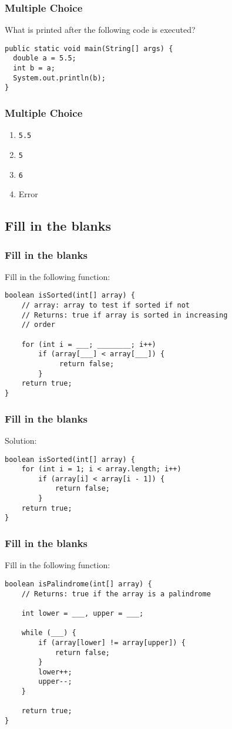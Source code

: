 \documentclass[9pt]{beamer}
\begin{document}
\begin{frame}[fragile]
  \frametitle{Multiple Choice}
  What is printed after the following code is executed?

  \begin{lstlisting}
public static void main(String[] args) {
  double a = 5.5;
  int b = a;
  System.out.println(b);
}
  \end{lstlisting}
\end{frame}
\begin{frame}[fragile]
  \frametitle{Multiple Choice}
  \begin{enumerate}
    \item
      {\tt 5.5}
    \item
      {\tt 5}
    \item
      {\tt 6}
    \item
      \alert<2>{Error}
  \end{enumerate}
\end{frame}


\subsection{Fill in the blanks}
\begin{frame}[fragile]
  \frametitle{Fill in the blanks}
  Fill in the following function:
  \begin{lstlisting}
boolean isSorted(int[] array) {
    // array: array to test if sorted if not
    // Returns: true if array is sorted in increasing
    // order

    for (int i = ___; ________; i++)
        if (array[___] < array[___]) {
             return false;
        }
    return true;
}
  \end{lstlisting}
\end{frame}

\begin{frame}[fragile]
  \frametitle{Fill in the blanks}
  Solution:
  \begin{lstlisting}
boolean isSorted(int[] array) {
    for (int i = 1; i < array.length; i++)
        if (array[i] < array[i - 1]) {
            return false;
        }
    return true;
}
  \end{lstlisting}
\end{frame}

\begin{frame}[fragile]
  \frametitle{Fill in the blanks}
  Fill in the following function:
  \begin{lstlisting}
boolean isPalindrome(int[] array) {
    // Returns: true if the array is a palindrome

    int lower = ___, upper = ___;

    while (___) {
        if (array[lower] != array[upper]) {
            return false;
        }
        lower++;
        upper--;
    }

    return true;
}
  \end{lstlisting}
\end{frame}
\end{document}
